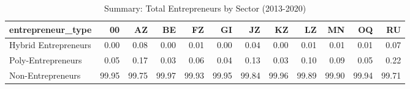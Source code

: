 \begin{table}[ht]
\centering
\caption{Summary: Total Entrepreneurs by Sector (2013-2020)} 
\label{tab:entrepreneurs_by_sector_summary}
\begin{tabular}{lrrrrrrrrrrr}
  \toprule
entrepreneur\_type & 00 & AZ & BE & FZ & GI & JZ & KZ & LZ & MN & OQ & RU \\ 
  \midrule
Hybrid Entrepreneurs & 0.00 & 0.08 & 0.00 & 0.01 & 0.00 & 0.04 & 0.00 & 0.01 & 0.01 & 0.01 & 0.07 \\ 
  Poly-Entrepreneurs & 0.05 & 0.17 & 0.03 & 0.06 & 0.04 & 0.13 & 0.03 & 0.10 & 0.09 & 0.05 & 0.22 \\ 
  Non-Entrepreneurs & 99.95 & 99.75 & 99.97 & 99.93 & 99.95 & 99.84 & 99.96 & 99.89 & 99.90 & 99.94 & 99.71 \\ 
   \bottomrule
\end{tabular}
\end{table}
